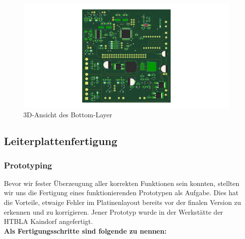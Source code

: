 \begin{figure}[hb]
    \includegraphics[scale=0.24]{fig/elektro/PlatineBot.jpg}
    \caption{3D-Ansicht des Bottom-Layer}
\end{figure}

\newpage
\subsection{Leiterplattenfertigung}

\subsubsection{Prototyping}

Bevor wir fester Überzeugung aller korrekten Funktionen sein konnten, stellten wir uns die Fertigung eines funktionierenden Prototypen als Aufgabe.
Dies hat die Vorteile, etwaige Fehler im Platinenlayout bereits vor der finalen Version zu erkennen und zu korrigieren.
Jener Prototyp wurde in der Werkstätte der \acs{HTBLA} Kaindorf angefertigt. \\

\textbf{Als Fertigungsschritte sind folgende zu nennen:}

